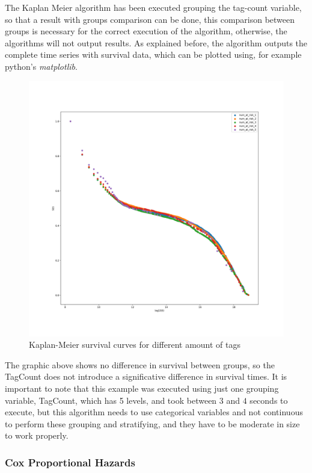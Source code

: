 \documentclass[11pt]{book} %
\begin{document}
        The Kaplan Meier algorithm has been executed grouping the tag-count variable, so that a result with groups comparison can be done, this comparison between groups is necessary for the correct execution of the algorithm, otherwise, the algorithms will not output results. As explained before, the algorithm outputs the complete time series with survival data, which can be plotted using, for example python's \emph{matplotlib}.

        \begin{figure}[!h]
          \includegraphics[width=\textwidth]{KM_TAGS.png}
          \caption{Kaplan-Meier survival curves for different amount of tags}
          \label{img:km-surv-curves}
        \end{figure}

        The graphic above shows no difference in survival between groups, so the TagCount does not introduce a significative difference in survival times.
        It is important to note that this example was executed using just one grouping variable, TagCount, which has 5 levels, and took between $3$ and $4$ seconds to execute, but this algorithm needs to use categorical variables and not continuous to perform these grouping and stratifying, and they have to be moderate in size to work properly.

      \subsubsection{Cox Proportional Hazards}
\end{document}

